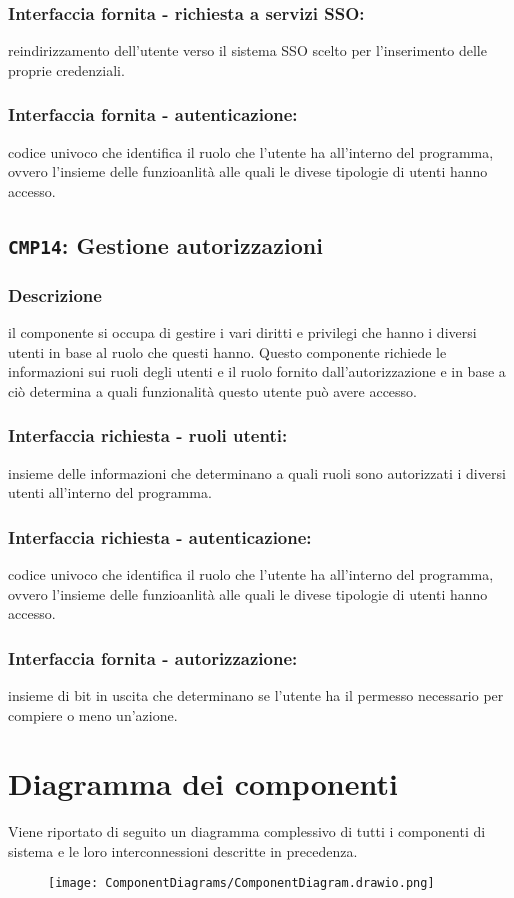         \subsubsection{Interfaccia fornita - richiesta a servizi SSO:}
            reindirizzamento dell'utente verso il sistema SSO scelto per l'inserimento delle proprie credenziali.
        \subsubsection{Interfaccia fornita - autenticazione:}
        codice univoco che identifica il ruolo che l'utente ha all'interno del programma, ovvero l'insieme delle funzioanlità alle quali le divese tipologie di utenti hanno accesso.
    
    \subsection{\texttt{CMP14}: Gestione autorizzazioni}
        \subsubsection{Descrizione}
            il componente si occupa di gestire i vari diritti e privilegi che hanno i diversi utenti in base al ruolo che questi hanno. Questo componente richiede le informazioni sui ruoli degli utenti e il ruolo fornito dall'autorizzazione e in base a ciò determina a quali funzionalità questo utente può avere accesso. 
        \subsubsection{Interfaccia richiesta - ruoli utenti:}
            insieme delle informazioni che determinano a quali ruoli sono autorizzati i diversi utenti all'interno del programma.
        \subsubsection{Interfaccia richiesta - autenticazione:}
            codice univoco che identifica il ruolo che l'utente ha all'interno del programma, ovvero l'insieme delle funzioanlità alle quali le divese tipologie di utenti hanno accesso.
        \subsubsection{Interfaccia fornita - autorizzazione:}
            insieme di bit in uscita che determinano se l'utente ha il permesso necessario per compiere o meno un'azione.

\section{Diagramma dei componenti}
    Viene riportato di seguito un diagramma complessivo di tutti i componenti di sistema e le loro interconnessioni descritte in precedenza.
    \begin{figure}[H]
        \centering
        \texttt{[image: ComponentDiagrams/ComponentDiagram.drawio.png]}
    \end{figure}